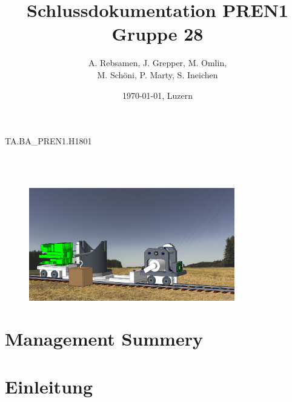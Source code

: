 \documentclass[11pt]{scrartcl}
\title{Schlussdokumentation PREN1 Gruppe 28}
\author{A. Rebsamen, J. Grepper, M. Omlin, \\ M. Schöni, P. Marty, S. Ineichen}
\date{\today{}, Luzern}
\begin{document}
        \begin{titlingpage}
            \begin{center}
                \begin{Huge} %
                    TA.BA{\_}PREN1.H1801 \\
                    \textbf{\thetitle} \\
                \end{Huge}
                \vspace{0.5cm}
                \begin{huge} %
                    \theauthor \\
                \end{huge}
                \vspace{0.5cm}
                \vspace{1cm}
                \begin{figure}[H] %
                    \centering
                    \includegraphics[width=0.8\textwidth]{images/uebersicht_Zug.png}
                \end{figure}
                \vspace{0.5cm}
                \begin{huge} %
                    \thedate
                \end{huge}
            \end{center}
        \end{titlingpage}


        \tableofcontents
        \clearpage

        \section{Management Summery}
        
        \clearpage
        \section{Einleitung}
        
        \clearpage
\end{document}
